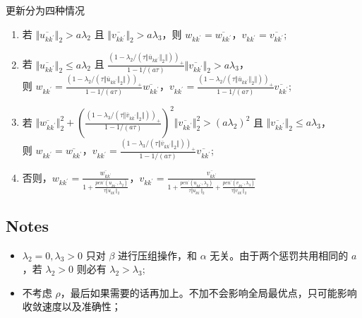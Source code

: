 \documentclass[12pt, a4paper, oneside]{article}
\numberwithin{equation}{section}
\begin{document}
更新分为四种情况
\begin{enumerate}
	\item 若 $\Vert\overline{u_{kk^{\prime}}}\Vert_2 > a\lambda_2$ 且 $\Vert\overline{v_{kk^{\prime}}}\Vert_2 > a\lambda_3$，则 $w_{kk^{\prime}} = \overline{w_{kk^{\prime}}}$，$v_{kk^{\prime}} = \overline{v_{kk^{\prime}}}$;
	\item 若 $\Vert\overline{u_{kk^{\prime}}}\Vert_2 \leq a\lambda_2$ 且 $\displaystyle\frac{\left(1-\lambda_2/(\tau \Vert\overline u_{kk^{\prime}}\Vert_2 \Vert)\right)_+}{1-1/(a\tau)}\Vert\overline{v_{kk^{\prime}}}\Vert_2 > a\lambda_3$，\\ 则 $w_{kk^{\prime}} = \displaystyle\frac{\left(1-\lambda_2/(\tau \Vert\overline u_{kk^{\prime}}\Vert_2 \Vert)\right)_+}{1-1/(a\tau)}\overline{w_{kk^{\prime}}}$，$v_{kk^{\prime}} =\displaystyle\frac{\left(1-\lambda_2/(\tau \Vert\overline u_{kk^{\prime}}\Vert_2 \Vert)\right)_+}{1-1/(a\tau)} \overline{v_{kk^{\prime}}}$;
	\item 若 $\Vert\overline{w_{kk^{\prime}}}\Vert_2^2 + \left(\displaystyle\frac{\left(1-\lambda_3/(\tau \Vert\overline v_{kk^{\prime}}\Vert_2 \Vert)\right)_+}{1-1/(a\tau)}\right)^2 \Vert\overline{v_{kk^{\prime}}}\Vert_2^2 > (a\lambda_2)^2$ 且 $\Vert\overline{v_{kk^{\prime}}}\Vert_2 \leq a\lambda_3$，\\
	则 $w_{kk^{\prime}} = \overline{w_{kk^{\prime}}}$，$v_{kk^{\prime}} = \displaystyle\frac{\left(1-\lambda_3/(\tau \Vert\overline v_{kk^{\prime}}\Vert_2 \Vert)\right)_+}{1-1/(a\tau)}\overline{v_{kk^{\prime}}}$;
	\item 否则，$w_{kk^{\prime}} = \displaystyle\frac{\overline{w_{kk^{\prime}}}}{1 + \displaystyle\frac{pen^{\prime}(u_{kk^\prime}, \lambda_2)}{\tau\Vert u_{kk^{\prime}}\Vert_2}}$，$v_{kk^{\prime}} = \displaystyle\frac{\overline{v_{kk^{\prime}}}}{1 +\displaystyle\frac{pen^{\prime}(u_{kk^\prime}, \lambda_2)}{\tau\Vert u_{kk^{\prime}}\Vert_2} + \displaystyle\frac{pen^{\prime}(v_{kk^\prime}, \lambda_3)}{\tau\Vert v_{kk^{\prime}}\Vert_2}}$
\end{enumerate}


\subsection{Notes}
\begin{itemize}
	\item $\lambda_2 = 0, \lambda_3 > 0$ 只对 $\beta$ 进行压组操作，和 $\alpha$ 无关。由于两个惩罚共用相同的 $a$，若 $\lambda_2 > 0$ 则必有 $\lambda_2 > \lambda_3$;
	\item 不考虑 $\rho$，最后如果需要的话再加上。不加不会影响全局最优点，只可能影响收敛速度以及准确性；
\end{itemize}

\newpage


\end{document}

